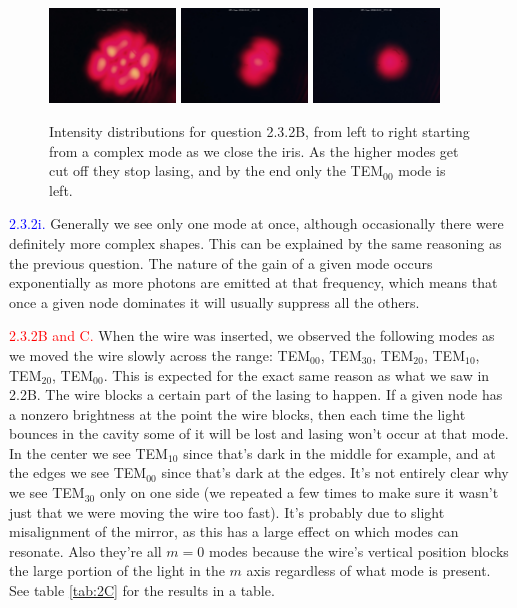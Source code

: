 \documentclass[letterpaper, reqno,11pt]{article}
\begin{document}
\begin{figure}[htpb]
    \centering
    \includegraphics[width=0.3\textwidth]{data/2B/im_0229_20240301_175322.jpg}
    \includegraphics[width=0.3\textwidth]{data/2B/im_0227_20240301_175136.jpg}
    \includegraphics[width=0.3\textwidth]{data/2B/im_0228_20240301_175138.jpg}
    \caption{Intensity distributions for question 2.3.2B, from left to right starting from a complex mode as we close the iris. As the higher modes get cut off they stop lasing, and by the end only the TEM$_{00}$ mode is left.}
    \label{fig:2B}
\end{figure}

\noindent \textcolor{blue}{2.3.2i.} Generally we see only one mode at once, although occasionally there were definitely more complex shapes. This can be explained by the same reasoning as the previous question. The nature of the gain of a given mode occurs exponentially as more photons are emitted at that frequency, which means that once a given node dominates it will usually suppress all the others.

\noindent \textcolor{red}{2.3.2B and C.} When the wire was inserted, we observed the following modes as we moved the wire slowly across the range: TEM$_{00}$, TEM$_{30}$, TEM$_{20}$, TEM$_{10}$, TEM$_{20}$, TEM$_{00}$. This is expected for the exact same reason as what we saw in 2.2B. The wire blocks a certain part of the lasing to happen. If a given node has a nonzero brightness at the point the wire blocks, then each time the light bounces in the cavity some of it will be lost and lasing won't occur at that mode. In the center we see TEM$_{10}$ since that's dark in the middle for example, and at the edges we see TEM$_{00}$ since that's dark at the edges. It's not entirely clear why we see TEM$_{30}$ only on one side (we repeated a few times to make sure it wasn't just that we were moving the wire too fast). It's probably due to slight misalignment of the mirror, as this has a large effect on which modes can resonate. Also they're all $m=0$ modes because the wire's vertical position blocks the large portion of the light in the $m$ axis regardless of what mode is present. See table \ref{tab:2C} for the results in a table.
\end{document}
